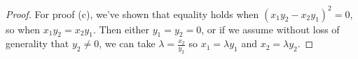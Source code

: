 \documentclass{article}
\begin{document}
\begin{enumerate}
\begin{proof}
		For proof (c), we've shown that equality holds when $(x_1y_2 - x_2y_1)^2 = 0$, so when $x_1y_2 = x_2y_1$. Then either $y_1 = y_2 = 0$, or if we assume without loss of generality that $y_2 \ne 0$, we can take $\lambda = \frac{x_2}{y_2}$ so $x_1 = \lambda y_1$ and $x_2 = \lambda y_2$.
	\end{proof}
\end{enumerate}
\end{document}
